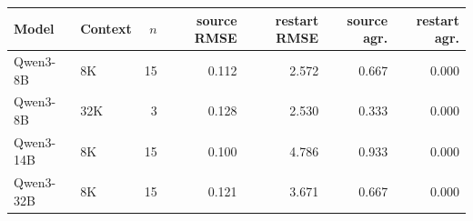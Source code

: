 \begin{tabular}{llrrrrr}
\toprule
Model & Context & $n$ & source RMSE & restart RMSE & source agr. & restart agr. \\
\midrule
Qwen3-8B & 8K & 15 & 0.112 & 2.572 & 0.667 & 0.000 \\
Qwen3-8B & 32K & 3 & 0.128 & 2.530 & 0.333 & 0.000 \\
Qwen3-14B & 8K & 15 & 0.100 & 4.786 & 0.933 & 0.000 \\
Qwen3-32B & 8K & 15 & 0.121 & 3.671 & 0.667 & 0.000 \\
\bottomrule
\end{tabular}
